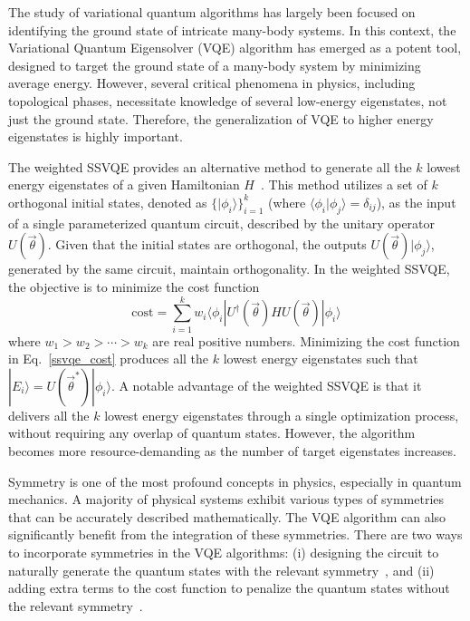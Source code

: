 The study of variational quantum algorithms has largely been focused on identifying the ground state of intricate many-body systems. In this context, the Variational Quantum Eigensolver (VQE) algorithm has emerged as a potent tool, designed to target the ground state of a many-body system by minimizing average energy. However, several critical phenomena in physics, including topological phases, necessitate knowledge of several low-energy eigenstates, not just the ground state. Therefore, the generalization of VQE to higher energy eigenstates is highly important.

The weighted SSVQE provides an alternative method to generate all the $k$ lowest energy eigenstates of a given Hamiltonian $H$~\cite{?}. This method utilizes a set of $k$ orthogonal initial states, denoted as $\{|\phi_{i}\rangle\}_{i=1}^{k}$ (where $\langle \phi_{i} | \phi_{j} \rangle = \delta_{ij}$), as the input of a single parameterized quantum circuit, described by the unitary operator $U(\vec{\theta})$. Given that the initial states are orthogonal, the outputs $U(\vec{\theta})| \phi_{j} \rangle$, generated by the same circuit, maintain orthogonality. In the weighted SSVQE, the objective is to minimize the cost function
\begin{equation}
    \mathrm{cost} = \sum_{i=1}^{k} w_{i} \langle \phi_{i}| U^{\dagger}(\vec{\theta}) H U(\vec{\theta}) | \phi_{i} \rangle
    \label{ssvqe_cost}
\end{equation}
where $w_1 > w_2 > \cdots > w_k$ are real positive numbers. Minimizing the cost function in Eq.~\eqref{ssvqe_cost} produces all the $k$ lowest energy eigenstates such that $|E_{i}\rangle = U(\vec{\theta}^{*})|\phi_{i}\rangle$.
A notable advantage of the weighted SSVQE is that it delivers all the $k$ lowest energy eigenstates through a single optimization process, without requiring any overlap of quantum states. However, the algorithm becomes more resource-demanding as the number of target eigenstates increases.

Symmetry is one of the most profound concepts in physics, especially in quantum mechanics. A majority of physical systems exhibit various types of symmetries that can be accurately described mathematically. The VQE algorithm can also significantly benefit from the integration of these symmetries. There are two ways to incorporate symmetries in the VQE algorithms: (i) designing the circuit to naturally generate the quantum states with the relevant symmetry~\cite{?}, and (ii) adding extra terms to the cost function to penalize the quantum states without the relevant symmetry~\cite{?}.


